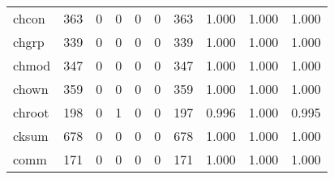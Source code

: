\begin{longtable}{lp{2.0cm}p{2.0cm}p{2.0cm}p{2.0cm}p{2.0cm}p{2.0cm}p{2.0cm}p{2.0cm}p{2.0cm}}
chcon     &                    363 &                                  0 &                                 0 &                                0 &                                 0 &                             363 &                                   1.000 &                                  1.000 &                                1.000 \\
chgrp     &                    339 &                                  0 &                                 0 &                                0 &                                 0 &                             339 &                                   1.000 &                                  1.000 &                                1.000 \\
chmod     &                    347 &                                  0 &                                 0 &                                0 &                                 0 &                             347 &                                   1.000 &                                  1.000 &                                1.000 \\
chown     &                    359 &                                  0 &                                 0 &                                0 &                                 0 &                             359 &                                   1.000 &                                  1.000 &                                1.000 \\
chroot    &                    198 &                                  0 &                                 1 &                                0 &                                 0 &                             197 &                                   0.996 &                                  1.000 &                                0.995 \\
cksum     &                    678 &                                  0 &                                 0 &                                0 &                                 0 &                             678 &                                   1.000 &                                  1.000 &                                1.000 \\
comm      &                    171 &                                  0 &                                 0 &                                0 &                                 0 &                             171 &                                   1.000 &                                  1.000 &                                1.000 \\

\end{longtable}
